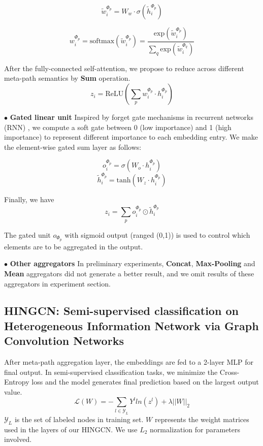 \begin{equation}
\label{eq:mp_attn}
\tilde{w}_i^{\Phi_p} = W_w \cdot \sigma(\tilde{h}^{\Phi_p}_i)
\end{equation}

\begin{equation}
\label{eq:mp_soft}
w_i^{\Phi_p} = \text{softmax}(\tilde{w}_i^{\Phi_p}) = \dfrac{\text{exp}(\tilde{w}_i^{\Phi_p})}{\sum_q \text{exp}(\tilde{w}_i^{\Phi_q})}
\end{equation}

After the fully-connected self-attention, we propose to reduce across different meta-path semantics by \textbf{Sum} operation.
\begin{equation}
\label{eq:mp_asum}
z_i = \text{ReLU}(\sum_p w_i^{\Phi_p} \cdot h^{\Phi_p}_i)
\end{equation}

$\bullet$ \textbf{Gated linear unit}
Inspired by forget gate mechanisms in recurrent networks (RNN) , we compute a soft gate between 0 (low importance) and 1 (high importance) to represent different importance to each embedding entry.
We make the element-wise gated sum layer as follows:
\begin{multicols}{2}
\begin{equation}
o^{\Phi_p}_i=\sigma(W_o \cdot h^{\Phi_p}_i)
\end{equation}\break
\begin{equation}
\tilde{h}^{\Phi_p}_i=\text{tanh}(W_z \cdot h^{\Phi_p}_i)
\end{equation}
\end{multicols}
Finally, we have
\begin{equation}
\label{eq:mp_sum}
{z}_i= \sum_p o^{\Phi_p}_i\odot \tilde{h}^{\Phi_p}_i
\end{equation}

The gated unit $o_{\Phi_p}$ with sigmoid output (ranged (0,1)) is used to control which elements are to be aggregated in the output. 
 
$\bullet$ \textbf{Other aggregators}
In preliminary experiments, \textbf{Concat}, \textbf{Max-Pooling} and \textbf{Mean} aggregators did not generate a better result, and we omit results of these aggregators in experiment section.

\subsection{HINGCN: Semi-supervised classification on Heterogeneous Information Network via Graph Convolution Networks}
After meta-path aggregation layer, the embeddings are fed to a 2-layer MLP for final output. In semi-supervised classification tasks, we minimize the Cross-Entropy loss and the model generates final prediction based on the largest output value.
\begin{equation}
\label{eq:loss}
\mathcal{L}(W)=   - \sum_{l\in \mathcal{Y}_L}Y^l ln(z^l)   + \lambda || W ||_2
\end{equation}
$ \mathcal{Y}_L$ is the set of labeled nodes in training set. $W$ represents the weight matrices used in the layers of our HINGCN. We use $L_2$ normalization for parameters involved.


